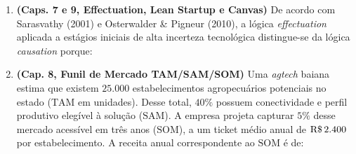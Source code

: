 \begin{enumerate}[leftmargin=1.5em, itemsep=5pt, resume]
  \item \textbf{(Caps. 7 e 9, Effectuation, Lean Startup e Canvas)} De acordo com Sarasvathy (2001) e Osterwalder \& Pigneur (2010), a lógica \textit{effectuation} aplicada a estágios iniciais de alta incerteza tecnológica distingue-se da lógica \textit{causation} porque:

  \item \textbf{(Cap. 8, Funil de Mercado TAM/SAM/SOM)} Uma \textit{agtech} baiana estima que existem $25.000$ estabelecimentos agropecuários potenciais no estado ($\text{TAM}$ em unidades). Desse total, $40\%$ possuem conectividade e perfil produtivo elegível à solução ($\text{SAM}$). A empresa projeta capturar $5\%$ desse mercado acessível em três anos ($\text{SOM}$), a um ticket médio anual de $\text{R\$\,}{2.400}$ por estabelecimento. A receita anual correspondente ao $\text{SOM}$ é de:


\end{enumerate}
